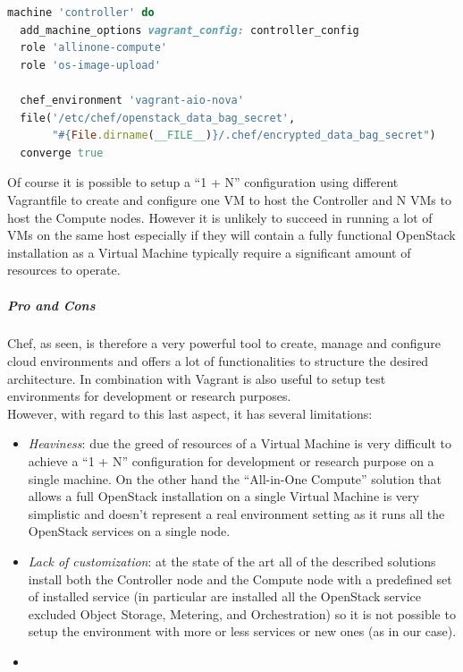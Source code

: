\begin{lstlisting}[language=Ruby,numbers=none]
machine 'controller' do
  add_machine_options vagrant_config: controller_config
  role 'allinone-compute'
  role 'os-image-upload'

  chef_environment 'vagrant-aio-nova'
  file('/etc/chef/openstack_data_bag_secret',
       "#{File.dirname(__FILE__)}/.chef/encrypted_data_bag_secret")
  converge true
\end{lstlisting}

Of course it is possible to setup a ``1 + N'' configuration using different Vagrantfile to create and configure one VM to host the Controller and N VMs to host the Compute nodes. However it is unlikely to succeed in running a lot of VMs on the same host especially if they will contain a fully functional OpenStack installation as a Virtual Machine typically require a significant amount of resources to operate.


\subparagraph{Pro and Cons}
\label{subp:sota_chef_pro_cons}

Chef, as seen, is therefore a very powerful tool to create, manage and configure cloud environments and offers a lot of functionalities to structure the desired architecture. In combination with Vagrant is also useful to setup test environments for development or research purposes.\\
However, with regard to this last aspect, it has several limitations:
\begin{itemize}
\item \textit{Heaviness}: due the greed of resources of a Virtual Machine is very difficult to achieve a ``1 + N'' configuration for development or research purpose on a single machine. On the other hand the ``All-in-One Compute'' solution that allows a full OpenStack installation on a single Virtual Machine is very simplistic and doesn't represent a real environment setting as it runs all the OpenStack services on a single node.
\item \textit{Lack of customization}: at the state of the art all of the described solutions install both the Controller node and the Compute node with a predefined set of installed service (in particular are installed all the OpenStack service excluded Object Storage, Metering, and Orchestration) so it is not possible to setup the environment with more or less services or new ones (as in our case).
\item {}
\end{itemize}


